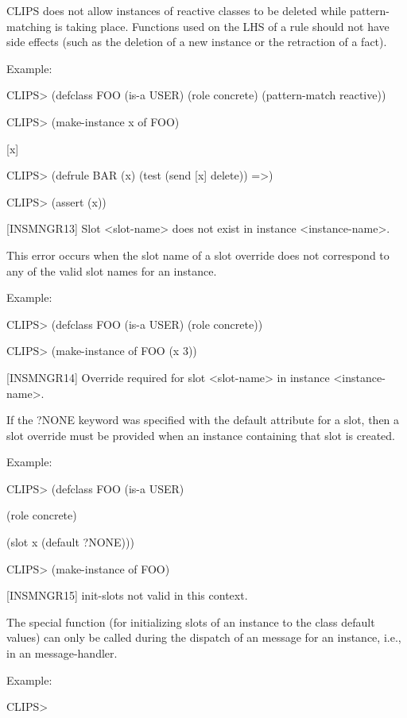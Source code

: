 \documentclass[letterpaper,10pt,english]{sphinxmanual}
\begin{document}
CLIPS does not allow instances of reactive classes to be deleted while
pattern-matching is taking place. Functions used on the LHS of a rule
should not have side effects (such as the deletion of a new instance or
the retraction of a fact).

Example:

CLIPS\textgreater{} (defclass FOO (is-a USER) (role concrete) (pattern-match
reactive))

CLIPS\textgreater{} (make-instance x of FOO)

{[}x{]}

CLIPS\textgreater{} (defrule BAR (x) (test (send {[}x{]} delete)) =\textgreater{})

CLIPS\textgreater{} (assert (x))

{[}INSMNGR13{]} Slot \textless{}slot-name\textgreater{} does not exist in instance \textless{}instance-name\textgreater{}.

This error occurs when the slot name of a slot override does not
correspond to any of the valid slot names for an instance.

Example:

CLIPS\textgreater{} (defclass FOO (is-a USER) (role concrete))

CLIPS\textgreater{} (make-instance of FOO (x 3))

{[}INSMNGR14{]} Override required for slot \textless{}slot-name\textgreater{} in instance
\textless{}instance-name\textgreater{}.

If the ?NONE keyword was specified with the default attribute for a
slot, then a slot override must be provided when an instance containing
that slot is created.

Example:

CLIPS\textgreater{} (defclass FOO (is-a USER)

(role concrete)

(slot x (default ?NONE)))

CLIPS\textgreater{} (make-instance of FOO)

{[}INSMNGR15{]} init-slots not valid in this context.

The special function  (for initializing slots of an
instance to the class default values) can only be called during the
dispatch of an  message for an instance, i.e., in an 
message-handler.

Example:

CLIPS\textgreater{}
\end{document}
